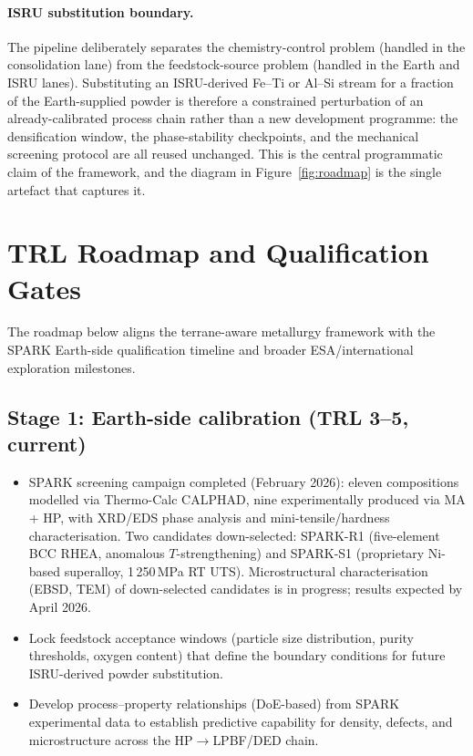 \documentclass[11pt,a4paper]{article}
\begin{document}
\paragraph{ISRU substitution boundary.} The pipeline deliberately separates the chemistry-control problem (handled in the consolidation lane) from the feedstock-source problem (handled in the Earth and ISRU lanes). Substituting an ISRU-derived Fe--Ti or Al--Si stream for a fraction of the Earth-supplied powder is therefore a constrained perturbation of an already-calibrated process chain rather than a new development programme: the densification window, the phase-stability checkpoints, and the mechanical screening protocol are all reused unchanged. This is the central programmatic claim of the framework, and the diagram in Figure~\ref{fig:roadmap} is the single artefact that captures it.

\section{TRL Roadmap and Qualification Gates}
\label{sec:roadmap}

The roadmap below aligns the terrane-aware metallurgy framework with the SPARK Earth-side qualification timeline and broader ESA/international exploration milestones.

\subsection*{Stage 1: Earth-side calibration (TRL 3--5, current)}

\begin{itemize}[leftmargin=1.4em]
  \item SPARK screening campaign completed (February 2026): eleven compositions modelled via Thermo-Calc CALPHAD, nine experimentally produced via MA + HP, with XRD/EDS phase analysis and mini-tensile/hardness characterisation. Two candidates down-selected: SPARK-R1 (five-element BCC RHEA, anomalous $T$-strengthening) and SPARK-S1 (proprietary Ni-based superalloy, 1\,250\,MPa RT UTS). Microstructural characterisation (EBSD, TEM) of down-selected candidates is in progress; results expected by April 2026.
  \item Lock feedstock acceptance windows (particle size distribution, purity thresholds, oxygen content) that define the boundary conditions for future ISRU-derived powder substitution.
  \item Develop process--property relationships (DoE-based) from SPARK experimental data to establish predictive capability for density, defects, and microstructure across the HP$\rightarrow$LPBF/DED chain.
\end{itemize}
\end{document}
